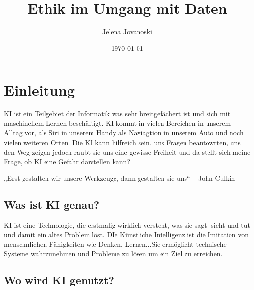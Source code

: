 \documentclass{report}
\title{Ethik im Umgang mit Daten}
\author{Jelena Jovanoski}
\date{\today}
\begin{document}
\maketitle


\tableofcontents

\chapter{Einleitung}

KI ist ein Teilgebiet der Informatik was sehr breitgefächert ist und sich mit maschinellem Lernen beschäftigt.
KI kommt in vielen Bereichen in unserem Alltag vor, als Siri in unserem Handy als Naviagtion in unserem Auto und noch vielen weiteren Orten. 
Die KI kann hilfreich sein, uns Fragen beantowrten, uns den Weg zeigen jedoch raubt sie uns eine gewisse Freiheit und da stellt sich meine Frage, ob KI eine Gefahr darstellen kann?

„Erst gestalten wir unsere Werkzeuge, dann gestalten sie uns“ – John Culkin

\section {Was ist KI genau?}
KI ist eine Technologie, die erstmalig wirklich versteht, was sie sagt, sieht und tut und damit ein altes Problem löst.
DIe Künstliche Intelligenz ist die Imitation von menschnlichen Fähigkeiten wie Denken, Lernen...Sie ermöglicht technische Systeme wahrzunehmen und Probleme zu lösen um ein Ziel zu erreichen.

\section {Wo wird KI genutzt?}
\end{document}
